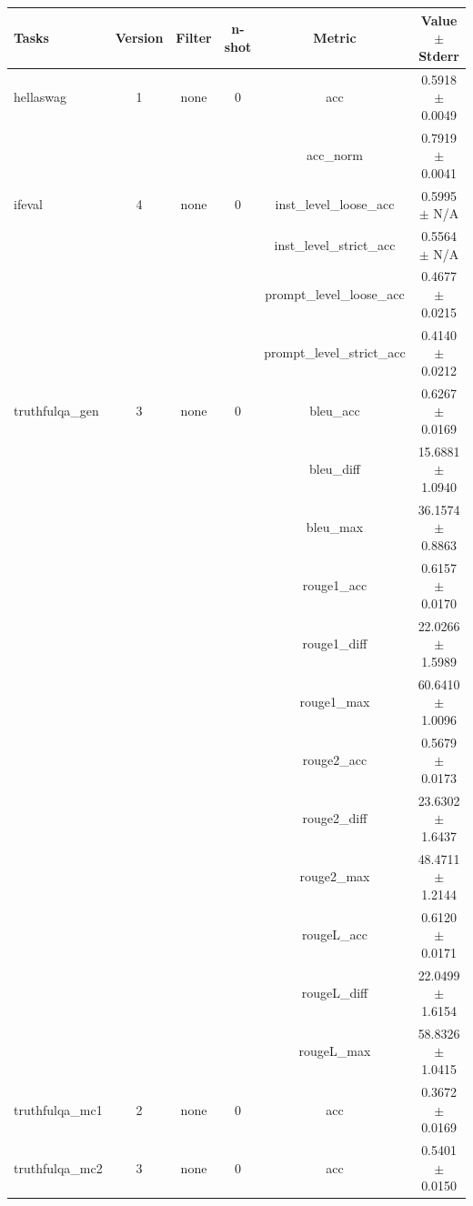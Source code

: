 \documentclass{ifacconf}
\begin{document}
\begin{strip}
\begin{minipage}{\textwidth}
    \begin{table}[H]
    \centering
    \begin{tabular}{|l|c|c|c|c|c|}
    \hline
    \textbf{Tasks} & \textbf{Version} & \textbf{Filter} & \textbf{n-shot} & \textbf{Metric} & \textbf{Value} $\pm$ \textbf{Stderr} \\ \hline
    hellaswag & 1 & none & 0 & acc & 0.5918 $\pm$ 0.0049 \\ \hline
    & & & & acc\_norm & 0.7919 $\pm$ 0.0041 \\ \hline
    ifeval & 4 & none & 0 & inst\_level\_loose\_acc & 0.5995 $\pm$ N/A \\ \hline
    & & & & inst\_level\_strict\_acc & 0.5564 $\pm$ N/A \\ \hline
    & & & & prompt\_level\_loose\_acc & 0.4677 $\pm$ 0.0215 \\ \hline
    & & & & prompt\_level\_strict\_acc & 0.4140 $\pm$ 0.0212 \\ \hline
    truthfulqa\_gen & 3 & none & 0 & bleu\_acc & 0.6267 $\pm$ 0.0169 \\ \hline
    & & & & bleu\_diff & 15.6881 $\pm$ 1.0940 \\ \hline
    & & & & bleu\_max & 36.1574 $\pm$ 0.8863 \\ \hline
    & & & & rouge1\_acc & 0.6157 $\pm$ 0.0170 \\ \hline
    & & & & rouge1\_diff & 22.0266 $\pm$ 1.5989 \\ \hline
    & & & & rouge1\_max & 60.6410 $\pm$ 1.0096 \\ \hline
    & & & & rouge2\_acc & 0.5679 $\pm$ 0.0173 \\ \hline
    & & & & rouge2\_diff & 23.6302 $\pm$ 1.6437 \\ \hline
    & & & & rouge2\_max & 48.4711 $\pm$ 1.2144 \\ \hline
    & & & & rougeL\_acc & 0.6120 $\pm$ 0.0171 \\ \hline
    & & & & rougeL\_diff & 22.0499 $\pm$ 1.6154 \\ \hline
    & & & & rougeL\_max & 58.8326 $\pm$ 1.0415 \\ \hline
    truthfulqa\_mc1 & 2 & none & 0 & acc & 0.3672 $\pm$ 0.0169 \\ \hline
    truthfulqa\_mc2 & 3 & none & 0 & acc & 0.5401 $\pm$ 0.0150 \\ \hline
    \end{tabular}
    \label{tab:llama31_q8}
    \end{table}


\end{minipage}
\end{strip}
\end{document}

